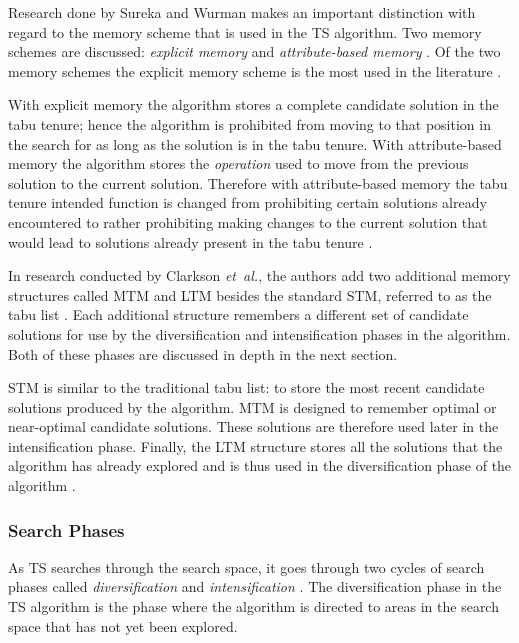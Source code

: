Research done by Sureka and  Wurman makes an important distinction with regard to the memory scheme that is used in the \gls{TS} algorithm. Two memory schemes are discussed: \emph{explicit memory} and \emph{attribute-based memory} \cite{TabuBiddingStrats,TabuFormGames}. Of the two memory schemes the explicit memory scheme is the most used in the literature \cite{TabuVechicleRoutingWithTimeWindows}.

With explicit memory the algorithm stores a complete candidate solution in the tabu tenure; hence the algorithm is prohibited from moving to that position in the search for as long as the solution is in the tabu tenure\cite{TabuBiddingStrats,TabuFormGames}. With attribute-based memory the algorithm stores the \emph{operation} used to move from the previous solution to the current solution\cite{TabuBiddingStrats,TabuFormGames}. Therefore with attribute-based memory the tabu tenure intended function is changed from prohibiting certain solutions already encountered to rather prohibiting making changes to the current solution that would lead to solutions already present in the tabu tenure \cite{TabuBiddingStrats,TabuFormGames}.

In research conducted by Clarkson \emph{et\ al.}\cite{MultiObjTabu}, the authors add two additional memory structures called \gls{MTM} and \gls{LTM} besides the standard \gls{STM}, referred to as the tabu list \cite{MultiObjTabu}. Each additional structure remembers a different set of candidate solutions for use by the diversification and intensification phases in the algorithm. Both of these phases are discussed in depth in the next section.

STM is similar to the traditional tabu list: to store the most recent candidate solutions produced by the algorithm. \gls{MTM} is designed to remember optimal or near-optimal candidate solutions. These solutions are therefore used later in the intensification phase. Finally, the \gls{LTM} structure stores all the solutions that the algorithm has already explored and is thus used in the diversification phase of the algorithm \cite{MultiObjTabu}.

\subsubsection{Search Phases}
\label{TSSearchPhases}
As \gls{TS} searches through the search space, it goes through two cycles of search phases called \emph{diversification} and \emph{intensification} \cite{TabuParameterization,TabuCrewSchedulingProblem,NonlinearGlobalTabu,SelfControllingReactiveTabu}. The diversification phase in the \gls{TS} algorithm is the phase where the algorithm is directed to areas in the search space that has not yet been explored\cite{ReactiveTabuVHR,SelfControllingReactiveTabu}.

